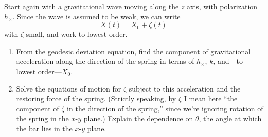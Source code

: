 \begin{exercises}
\begin{xca}
Start again with a gravitational wave moving along the $z$ axis, 
with polarization $h_{\times}$.
Since the wave is assumed to be weak, we can write
\begin{equation}
X(t) = X_{0} + \zeta(t)
\end{equation}
with $\zeta$ small, and work to lowest order.
\begin{enumerate}
\item From the geodesic deviation equation, find the component of
  gravitational acceleration along the direction of the spring in
  terms of $h_{\times}$, $k$, and---to lowest order---$X_{0}$. 
\item Solve the equations of motion for $\zeta$ subject to this
  acceleration and the restoring force of the spring. (Strictly
  speaking, by $\zeta$ I mean here ``the component of $\zeta$ in
  the direction of the spring,'' since we're ignoring rotation of
  the spring in the $x$-$y$ plane.) Explain the dependence on
  $\theta$, the angle at which the bar lies in the $x$-$y$
  plane. 
\end{enumerate}
\end{xca}
\end{exercises}
